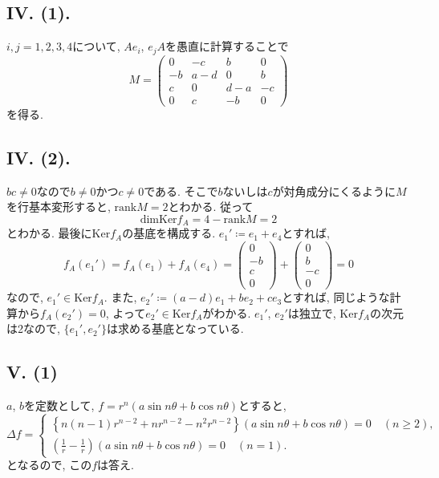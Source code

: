 \subsection*{IV. (1). }
$i,j=1,2,3,4$について, $Ae_i$, $e_jA$を愚直に計算することで
\begin{equation}
  M=\begin{pmatrix}
    0&-c&b&0\\
    -b&a-d&0&b\\
    c&0&d-a&-c\\
    0&c&-b&0
  \end{pmatrix}
\end{equation}
を得る. 

\subsection*{IV. (2). }
$bc\neq 0$なので$b\neq 0$かつ$c\neq 0$である. 
そこで$b$ないしは$c$が対角成分にくるように$M$を行基本変形すると, $\text{rank}{M}=2$とわかる. 
従って
\begin{equation}
  \text{dim}\text{Ker}f_A=4-\text{rank}M=2
\end{equation}
とわかる. 
最後に$\text{Ker}f_A$の基底を構成する. 
$e_1'\coloneqq e_1+e_4$とすれば, 
\begin{equation}
  f_A(e_1')=f_A(e_1)+f_A(e_4)=
  \begin{pmatrix}
    0\\
    -b\\
    c\\
    0
  \end{pmatrix}
  +
  \begin{pmatrix}
    0\\
    b\\
    -c\\
    0
  \end{pmatrix}
  =0
\end{equation}
なので, $e_1'\in \text{Ker}f_A$. 
また, $e_2'\coloneqq (a-d)e_1+be_2+ce_3$とすれば, 同じような計算から$f_A(e_2')=0$, よって$e_2'\in \text{Ker}f_A$がわかる. 
$e_1'$, $e_2'$は独立で, $\text{Ker}f_A$の次元は2なので, $\{e_1', e_2'\}$は求める基底となっている. 


\subsection*{V. (1)}
$a$, $b$を定数として, $f=r^n(a\sin{n\theta}+b\cos{n\theta})$とすると, 
\begin{equation}
  \Delta f=\begin{cases}
    \left\{ n(n-1)r^{n-2}+nr^{n-2}-n^2r^{n-2} \right\}(a\sin{n\theta}+b\cos{n\theta})=0\quad (n\geq 2), \\
    \left( \frac{1}{r}-\frac{1}{r} \right)(a\sin{n\theta}+b\cos{n\theta})=0\quad (n=1). 
  \end{cases}
\end{equation}
となるので, この$f$は答え. 



